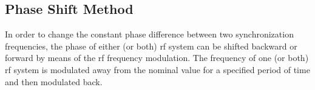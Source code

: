 %
%
%
%

\subsection{Phase Shift Method}
\label{sec:requirement_phase_shift}

In order to change the constant phase difference between two synchronization frequencies, the phase of either (or both) rf system can be shifted backward or forward by means of the rf frequency modulation. The frequency of one (or both) rf system is modulated away from the nominal value for a specified period of time and then modulated back.



